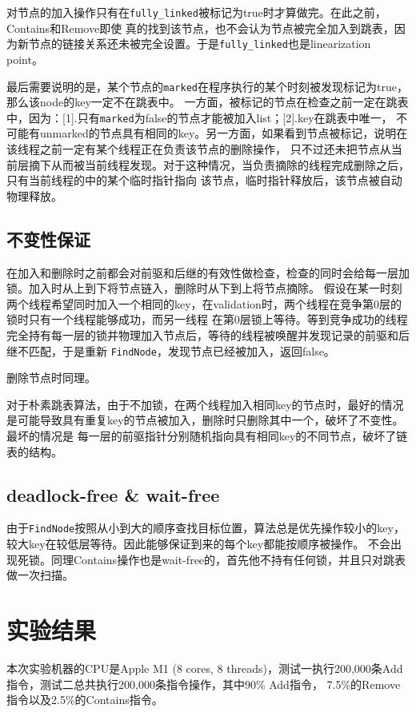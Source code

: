 \documentclass[UTF8, 10pt, twocolumn]{article}
\begin{document}
对节点的加入操作只有在\verb|fully_linked|被标记为true时才算做完。在此之前，Contains和Remove即使
真的找到该节点，也不会认为节点被完全加入到跳表，因为新节点的链接关系还未被完全设置。于是\verb|fully_linked|也是linearization point。

最后需要说明的是，某个节点的\verb|marked|在程序执行的某个时刻被发现标记为true，那么该node的key一定不在跳表中。
一方面，被标记的节点在检查之前一定在跳表中，因为：[1].只有\verb|marked|为false的节点才能被加入list；[2].key在跳表中唯一，
不可能有unmarked的节点具有相同的key。另一方面，如果看到节点被标记，说明在该线程之前一定有某个线程正在负责该节点的删除操作，
只不过还未把节点从当前层摘下从而被当前线程发现。对于这种情况，当负责摘除的线程完成删除之后，只有当前线程的中的某个临时指针指向
该节点，临时指针释放后，该节点被自动物理释放。

\subsection{不变性保证}
在加入和删除时之前都会对前驱和后继的有效性做检查，检查的同时会给每一层加锁。加入时从上到下将节点链入，删除时从下到上将节点摘除。
假设在某一时刻两个线程希望同时加入一个相同的key，在validation时，两个线程在竞争第0层的锁时只有一个线程能够成功，而另一线程
在第0层锁上等待。等到竞争成功的线程完全持有每一层的锁并物理加入节点后，等待的线程被唤醒并发现记录的前驱和后继不匹配，于是重新
\verb|FindNode|，发现节点已经被加入，返回false。

删除节点时同理。

对于朴素跳表算法，由于不加锁，在两个线程加入相同key的节点时，最好的情况是可能导致具有重复key的节点被加入，删除时只删除其中一个，破坏了不变性。最坏的情况是
每一层的前驱指针分别随机指向具有相同key的不同节点，破坏了链表的结构。

\subsection{deadlock-free \& wait-free}
由于\verb|FindNode|按照从小到大的顺序查找目标位置，算法总是优先操作较小的key，较大key在较低层等待。因此能够保证到来的每个key都能按顺序被操作。
不会出现死锁。同理Contains操作也是wait-free的，首先他不持有任何锁，并且只对跳表做一次扫描。

\section{实验结果}
本次实验机器的CPU是Apple M1 (8 cores, 8 threads)，测试一执行200,000条Add指令，测试二总共执行200,000条指令操作，其中90\% Add指令，
7.5\%的Remove指令以及2.5\%的Contains指令。
\end{document}
